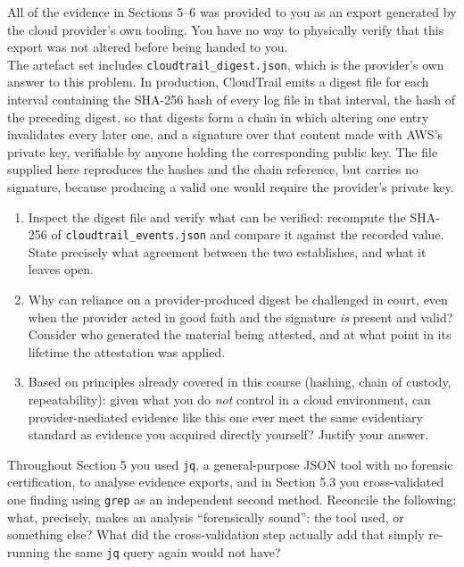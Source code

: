 \begin{questionbox}[title=Question (b)]
All of the evidence in Sections 5--6 was provided to you as an export generated by the cloud
provider's own tooling. You have no way to physically verify that this export was not altered
before being handed to you.
\\
The artefact set includes \texttt{cloudtrail\_digest.json}, which is the provider's own answer to this problem. In production, CloudTrail emits a digest file for each interval containing the SHA-256 hash of every log file in that interval, the hash of the preceding digest, so that digests form a chain in which altering one entry invalidates every later one, and a signature over that content made with AWS's private key, verifiable by anyone holding the corresponding public key. The file supplied here reproduces the hashes and the chain reference, but carries no signature, because producing a valid one would require the provider's private key.
\begin{enumerate}[label=(\alph*)]
	\item Inspect the digest file and verify what can be verified: recompute the SHA-256 of
	      \texttt{cloudtrail\_events.json} and compare it against the recorded value. State
	      precisely what agreement between the two establishes, and what it leaves open.
	\item Why can reliance on a provider-produced digest be challenged in court, even when the
	      provider acted in good faith and the signature \emph{is} present and valid? Consider who
	      generated the material being attested, and at what point in its lifetime the attestation
	      was applied.
	\item Based on principles already covered in this course (hashing, chain of custody,
	      repeatability): given what you do \emph{not} control in a cloud environment, can
	      provider-mediated evidence like this one ever meet the same evidentiary standard as
	      evidence you acquired directly yourself? Justify your answer.
\end{enumerate}
\end{questionbox}

\begin{answerbox}
\vspace{5cm}
\end{answerbox}

\begin{questionbox}[title=Question (c)]
Throughout Section 5 you used \texttt{jq}, a general-purpose JSON tool with no forensic
certification, to analyse evidence exports, and in Section 5.3 you cross-validated one finding
using \texttt{grep} as an independent second method. Reconcile the following: what, precisely,
makes an analysis ``forensically sound'': the tool used, or something else? What did the
cross-validation step actually add that simply re-running the same \texttt{jq} query again would
not have?
\end{questionbox}

\begin{answerbox}
\vspace{3cm}
\end{answerbox}